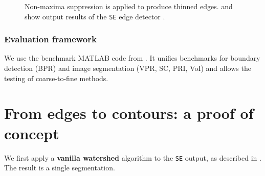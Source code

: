 \begin{figure}[t]
\centering
{}

\caption[Non-maxima suppression for thinned edges]{Non-maxima suppression is applied to produce thinned edges. \protect{} and \protect{} show output results of the {\tt SE} edge detector \cite{DollarICCV13edges}.}
\label{fig:edge-thinning}
\end{figure}

\subsubsection*{Evaluation framework}%
We use the benchmark MATLAB code from \cite{Galasso13Benchmark}. %
It unifies benchmarks for boundary detection (BPR) and image segmentation (VPR, SC, %
PRI, VoI) and allows the testing of coarse-to-fine methods. %

\section{From edges to contours: a proof of concept}
\label{sec:ch5-watershed-proof-of-concept}
We first apply a {\bf vanilla watershed} algorithm \cite{Beucher1992morphological,Najman1996geodesic,PINKlibrary} to the {\tt SE} output, as described in . The result is a single segmentation. 

